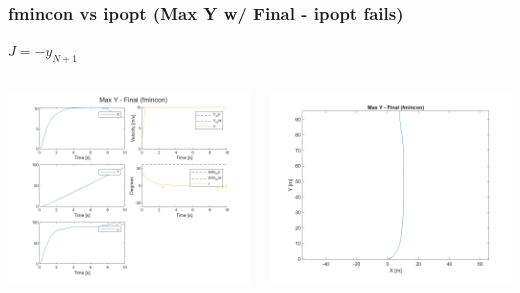 \documentclass[aspectratio=169]{beamer}
\begin{document}
\begin{frame}
	\frametitle{fmincon vs ipopt (Max Y w/ Final - ipopt fails)}
	$J = -y_{N+1}$
	\begin{columns}
		\begin{column}{0.4\textwidth}
			\includegraphics[width = \columnwidth]{figs/Max_Y_-_Final_(fmincon)_traj.png}
		\end{column}
		\begin{column}{0.25\textwidth}
			\includegraphics[width = \columnwidth]{figs/Max_Y_-_Final_(fmincon)_quiver.png}

\end{column}
\end{columns}
\end{frame}
\end{document}
